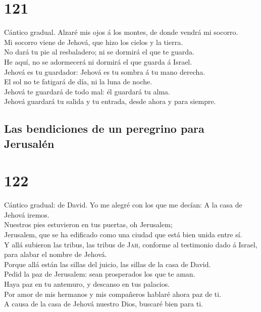 \hypertarget{section-120}{%
\section{121}\label{section-120}}

 Cántico gradual. Alzaré mis ojos á los montes, de donde
vendrá mi socorro.\\
 Mi socorro viene de Jehová, que hizo los cielos y la
tierra.\\
 No dará tu pie al resbaladero; ni se dormirá el que te
guarda.\\
 He aquí, no se adormecerá ni dormirá el que guarda á
Israel.\\
 Jehová es tu guardador: Jehová es tu sombra á tu mano
derecha.\\
 El sol no te fatigará de día, ni la luna de noche.\\
 Jehová te guardará de todo mal: él guardará tu alma.\\
 Jehová guardará tu salida y tu entrada, desde ahora y
para siempre.

\hypertarget{las-bendiciones-de-un-peregrino-para-jerusaluxe9n}{%
\subsection{Las bendiciones de un peregrino para
Jerusalén}\label{las-bendiciones-de-un-peregrino-para-jerusaluxe9n}}

\hypertarget{section-121}{%
\section{122}\label{section-121}}

 Cántico gradual: de David. Yo me alegré con los que me
decían: A la casa de Jehová iremos.\\
 Nuestros pies estuvieron en tus puertas, oh Jerusalem;\\
 Jerusalem, que se ha edificado como una ciudad que está
bien unida entre sí.\\
 Y allá subieron las tribus, las tribus de \textsc{Jah},
conforme al testimonio dado á Israel, para alabar el nombre de Jehová.\\
 Porque allá están las sillas del juicio, las sillas de la
casa de David.\\
 Pedid la paz de Jerusalem: sean prosperados los que te
aman.\\
 Haya paz en tu antemuro, y descanso en tus palacios.\\
 Por amor de mis hermanos y mis compañeros hablaré ahora
paz de ti.\\
 A causa de la casa de Jehová nuestro Dios, buscaré bien
para ti.

